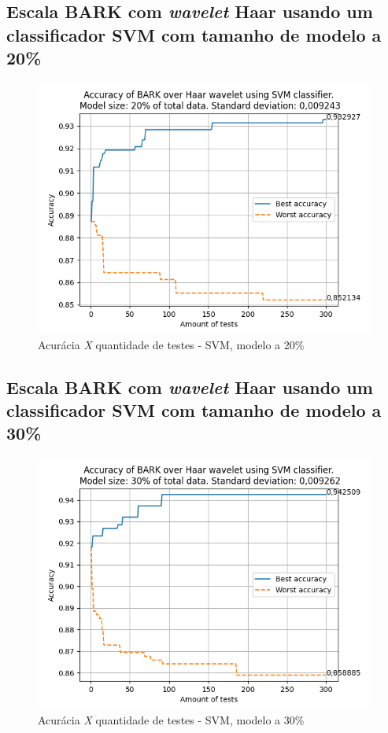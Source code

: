 		\subsection{Escala BARK com \textit{wavelet} Haar usando um classificador SVM com tamanho de modelo a 20\%}
			\begin{figure}[ht]
				\centering
				\includegraphics{images/results/confusionMatrices/classifier_SVM_20.png}
				\caption{Acurácia \textit{X} quantidade de testes - SVM, modelo a 20\%}
				\label{fig:classifiersvm20}
			\end{figure}
			
		
		\newpage
		\subsection{Escala BARK com \textit{wavelet} Haar usando um classificador SVM com tamanho de modelo a 30\%}
			\begin{figure}[ht]
				\centering
				\includegraphics{images/results/confusionMatrices/classifier_SVM_30.png}
				\caption{Acurácia \textit{X} quantidade de testes - SVM, modelo a 30\%}
				\label{fig:classifiersvm30}
			\end{figure}
			
	
